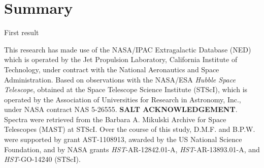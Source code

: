 \documentclass[iop]{emulateapj-rtx4}
\begin{document}
\section{Summary}



%  


\vspace{10pt}

\indent \textbullet \indent First result


\acknowledgements

This research has made use of the NASA/IPAC Extragalactic Database (NED) which is operated by the Jet Propulsion Laboratory, California Institute of Technology, under contract with the National Aeronautics and Space Administration. Based on observations with the NASA/ESA \textit{Hubble Space Telescope}, obtained at the Space Telescope Science Institute (STScI), which is operated by the Association of Universities for Research in Astronomy, Inc., under NASA contract NAS 5-26555. \textbf{SALT ACKNOWLEDGEMENT}. Spectra were retrieved from the Barbara A. Mikulski Archive for Space Telescopes (MAST) at STScI. Over the course of this study, D.M.F. and B.P.W. were supported by grant AST-1108913, awarded by the US National Science Foundation, and by NASA grants \textit{HST}-AR-12842.01-A, \textit{HST}-AR-13893.01-A, and \textit{HST}-GO-14240 (STScI). 



\nocite{*}


\end{document}
